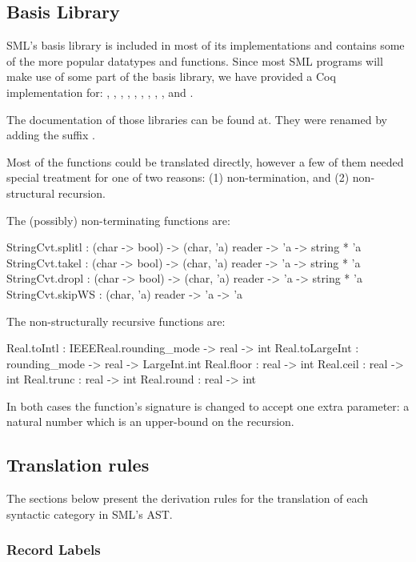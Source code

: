 \documentclass[a4paper,11pt]{article}
\newcommand{\giselle}[1]{\todo[linecolor=Plum,backgroundcolor=Plum!25,bordercolor=Plum]{G: #1}}
\begin{document}
\subsection{Basis Library}

SML's basis library is included in most of its implementations and
contains some of the more popular datatypes and functions. Since most
SML programs will make use of some part of the basis library, we have
provided a Coq implementation for:
,
,
,
,
,
,
,
,
, and
.

The documentation of those libraries can be found at\giselle{TODO:
make doc available somewhere}.
They were renamed by adding the suffix .

Most of the functions could be translated directly, however a few of
them needed special treatment for one of two reasons: (1)
non-termination, and (2) non-structural recursion. 

The (possibly) non-terminating functions are:
\begin{sml}
StringCvt.splitl : (char -> bool) -> (char, 'a) reader -> 'a -> string * 'a
StringCvt.takel  : (char -> bool) -> (char, 'a) reader -> 'a -> string * 'a
StringCvt.dropl  : (char -> bool) -> (char, 'a) reader -> 'a -> string * 'a
StringCvt.skipWS : (char, 'a) reader -> 'a -> 'a
\end{sml}

The non-structurally recursive functions are:
\begin{sml}
Real.toIntl : IEEEReal.rounding_mode -> real -> int
Real.toLargeInt : rounding_mode -> real -> LargeInt.int
Real.floor : real -> int
Real.ceil  : real -> int
Real.trunc : real -> int
Real.round : real -> int
\end{sml}

In both cases the function's signature is changed to accept
one extra parameter: a natural number which is an upper-bound on the
recursion.

\subsection{Translation rules}

The sections below present the derivation rules for the translation of
each syntactic category in SML's AST.

\subsubsection{Record Labels}
\end{document}
